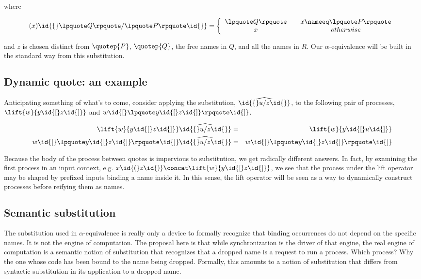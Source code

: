 where

\begin{eqnarray}
  (x)\id{\{} \lpquote Q \rpquote / \lpquote P \rpquote \id{\}}            = 
  \left\{ 
    \begin{array}{ccc}
      \lpquote Q \rpquote & & x \nameeq \lpquote P \rpquote \\
      x & & otherwise \\
    \end{array}
  \right. \nonumber
\end{eqnarray}

and $z$ is chosen distinct from $\quotep{P}$, $\quotep{Q}$, the free
names in $Q$, and all the names in $R$. Our $\alpha$-equivalence will
be built in the standard way from this substitution.

\subsection{ Dynamic quote: an example }

Anticipating something of what's to come, consider applying the
substitution, $\widehat{\id{\{}u / z \id{\}}}$, to the following pair
of processes, $\lift{w}{y \id{[}z\id{]}}$ and $w\id{[} \lpquote
y\id{[}z\id{]} \rpquote \id{]}$.

\begin{eqnarray}
  \lift{w}{y \id{[}z\id{]}}\widehat{\id{\{}u / z \id{\}}}
  & = &
  \lift{w}{y \id{[}u\id{]}} \nonumber\\
  w\id{[} \lpquote y\id{[}z\id{]} \rpquote \id{]} \widehat{ \id{\{}u / z \id{\}} }
  & = &
  w\id{[} \lpquote y\id{[}z\id{]} \rpquote \id{]} \nonumber
\end{eqnarray}

Because the body of the process between quotes is impervious to
substitution, we get radically different answers. In fact, by
examining the first process in an input context, e.g. $x \id{(} z
\id{)}\concat \lift{w}{y
\id{[}z\id{]}}$, we see that the process under the lift operator may
be shaped by prefixed inputs binding a name inside it. In this sense,
the lift operator will be seen as a way to dynamically construct
processes before reifying them as names.

\subsection{Semantic substitution}

The substitution used in $\alpha$-equivalence is really only a device
to formally recognize that binding occurrences do not depend on the
specific names. It is not the engine of computation. The proposal here
is that while synchronization is the driver of that engine, the real
engine of computation is a semantic notion of substitution that
recognizes that a dropped name is a request to run a process. Which
process? Why the one whose code has been bound to the name being
dropped. Formally, this amounts to a notion of substitution that
differs from syntactic substitution in its application to a dropped
name.

